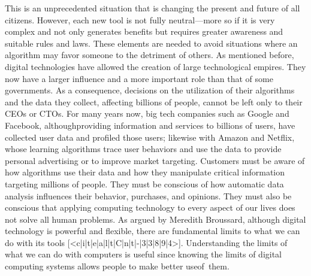 This is an unprecedented situation that is changing the present and future of all citizens. However, each new tool is not fully neutral---more so if it is very complex and not only generates benefits but requires greater awareness and suitable rules and laws. These elements are needed to avoid situations where an algorithm may favor someone to the detriment of others. As mentioned before, digital technologies have allowed the creation of large technological empires. They now have a larger influence and a more important role than that of some governments. As a consequence, decisions on the utilization of their algorithms and the data they collect, affecting billions of people, cannot be left only to their CEOs or CTOs. For many years now, big tech companies\vadjust{\pagebreak} such as Google and Facebook, although\break providing information and services to billions of users, have collected user data and profiled those users; likewise with Amazon and Netflix, whose learning algorithms trace user behaviors and use the data to provide personal advertising or to improve market targeting. Customers must be aware of how algorithms use their data and how they manipulate critical information targeting millions of people. They must be conscious of how automatic data analysis influences their behavior, purchases, and opinions. They must also be conscious that applying computing technology to every aspect of our lives does not solve all human problems. As argued by Meredith Broussard, although digital technology is powerful and flexible, there are fundamental limits to what we can do with its tools [<c|i|t|e|a|l|t|C|n|t|-|3|3|8|9|4>]. Understanding the limits of what we can do with computers is useful since knowing the limits of digital computing systems allows people to make better use\break of~them.

